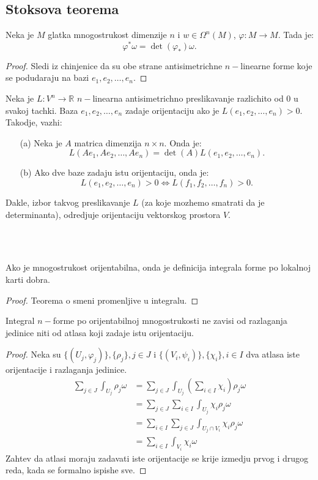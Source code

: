 \documentclass[a4paper,12pt]{article}
\newcommand{\RR}{\mathbb{R}}
\begin{document}
\subsection{Stoksova teorema}

\begin{tvr}
	Neka je $M$ glatka mnogostrukost dimenzije $n$ i $w\in \Omega^n(M)$, $\varphi:M\to M$. Tada je:
	\[ \varphi^* \omega = \det(\varphi_*) \omega .\] 
\end{tvr}
\begin{proof}
	Sledi iz chinjenice da su obe strane antisimetrichne $n-$linearne forme koje se podudaraju na bazi 
	$e_1, e_2, \dotso, e_n$.
\end{proof}

\begin{nap}
	Neka je $L:V^n\to \RR$ $n-$linearna antisimetrichno preslikavanje razlichito od $0$ u svakoj tachki. Baza
	$e_1, e_2, \dotso, e_n$ zadaje orijentaciju ako je $L(e_1, e_2, \dotso, e_n) > 0$. Takodje, vazhi:
	\begin{itemize}
		\item[(a)] Neka je $A$ matrica dimenzija $n\times n$. Onda je:
			\[ L(Ae_1, Ae_2, \dotso, Ae_n) = \det(A) L(e_1, e_2, \dotso, e_n) .\] 
		\item[(b)] Ako dve baze zadaju istu orijentaciju, onda je:
			\[L(e_1, e_2, \dotso, e_n) > 0 \iff L(f_1, f_2, \dotso, f_n) > 0.\] 
	\end{itemize}
	Dakle, izbor takvog preslikavanje $L$ (za koje mozhemo smatrati da je determinanta), odredjuje orijentaciju
	vektorskog prostora $V$.
\end{nap}
\\ \\
\begin{nap}
	Ako je mnogostrukost orijentabilna, onda je definicija integrala forme po lokalnoj karti dobra.
\end{nap}
\begin{proof}
	Teorema o smeni promenljive u integralu.
\end{proof}

\begin{tvr}
	Integral $n-$forme po orijentabilnoj mnogostrukosti ne zavisi od razlaganja jedinice niti od atlasa koji
	zadaje istu orijentaciju.
\end{tvr}
\begin{proof}
	Neka su $\{(U_j, \varphi_j)\}, \{\rho_j\}, j \in J$ i  $\{(V_i, \psi_i)\}, \{\chi_i\}, i \in I$ dva atlasa
	iste orijentacije i razlaganja jedinice.
	\begin{align*}
		\sum_{j \in J} \int_{U_j} \rho_j \omega &= \sum_{j \in J} \int_{U_j}(\sum_{i \in I} \chi_i) \rho_j \omega \\
		&= \sum_{j \in J} \sum_{i \in I}\int_{U_j}\chi_i \rho_j \omega \\
		&= \sum_{i \in I} \sum_{j \in J}\int_{U_j \cap V_i}\chi_i \rho_j \omega \\
		&= \sum_{i \in I} \int_{V_i}\chi_i\omega
	\end{align*}
	Zahtev da atlasi moraju zadavati iste orijentacije se krije izmedju prvog i drugog reda, kada
	se formalno ispishe sve.
\end{proof}
\end{document}
